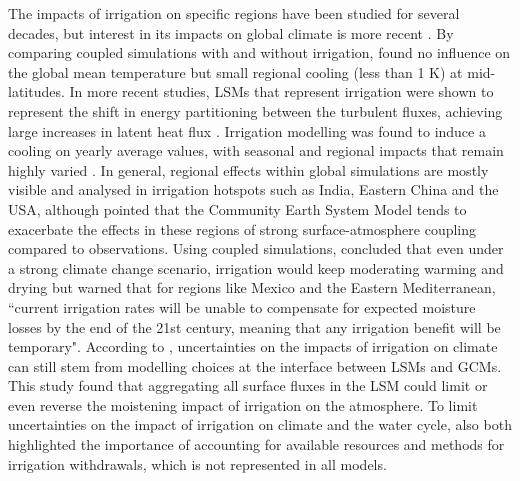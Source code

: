 \hfill

The impacts of irrigation on specific regions have been studied for several decades, but interest in its impacts on global climate is more recent \citep{boucher_direct_2004}. By comparing coupled simulations with and without irrigation, \citet{sacks_effects_2009} found no influence on the global mean temperature but small regional cooling (less than 1 K) at mid-latitudes. 
In more recent studies, LSMs that represent irrigation were shown to represent the shift in energy partitioning between the turbulent fluxes, achieving large increases in latent heat flux \citep{pokhrel_incorporating_2012, al-yaari_role_2022, arboleda-obando_validation_2024}. 
Irrigation modelling was found to induce a cooling on yearly average values, with seasonal and regional impacts that remain highly varied \citep{puma_effects_2010, cook_irrigation_2015}. 
In general, regional effects within global simulations are mostly visible and analysed in irrigation hotspots such as India, Eastern China and the USA, although \citet{chen_global_2019} pointed that the Community Earth System Model \citep[CESM, ][]{danabasoglu_community_2020} tends to exacerbate the effects in these regions of strong surface-atmosphere coupling compared to observations. 
Using coupled simulations, \citet{cook_divergent_2020} concluded that even under a strong climate change scenario, irrigation would keep moderating warming and drying but warned that for regions like Mexico and the Eastern Mediterranean, ``current irrigation rates will be unable to compensate for expected moisture losses by the end of the 21st century, meaning that any irrigation benefit will be temporary".
According to \citet{de_vrese_uncertainties_2018}, uncertainties on the impacts of irrigation on climate can still stem from modelling choices at the interface between LSMs and GCMs. 
This study found that aggregating all surface fluxes in the LSM could limit or even reverse the moistening impact of irrigation on the atmosphere.
To limit uncertainties on the impact of irrigation on climate and the water cycle, \citet{de_vrese_uncertainties_2018, cook_divergent_2020} also both highlighted the importance of accounting for available resources and methods for irrigation withdrawals, which is not represented in all models.

